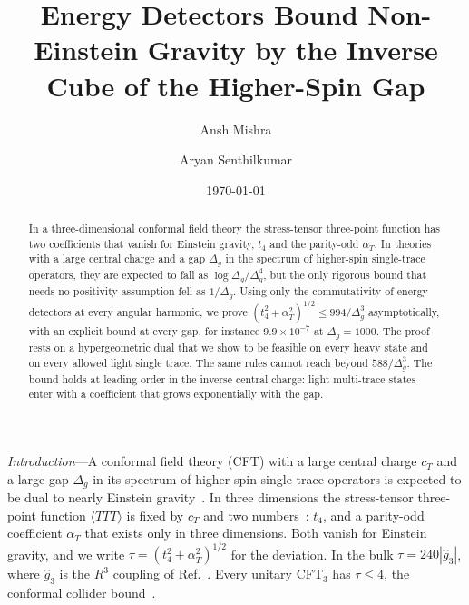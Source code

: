 \documentclass[aps,prl,twocolumn,superscriptaddress,nofootinbib,floatfix]{revtex4-2}
\begin{document}
\title{Energy Detectors Bound Non-Einstein Gravity by the Inverse Cube of the Higher-Spin Gap}

\author{Ansh Mishra}
\author{Aryan Senthilkumar}

\date{\today}

\begin{abstract}
In a three-dimensional conformal field theory the stress-tensor three-point function has two coefficients that vanish for Einstein
gravity, $t_4$ and the parity-odd $\alpha_T$. In theories with a large central charge and a gap $\Delta_g$ in the spectrum of higher-spin
single-trace operators, they are expected to fall as $\log\Delta_g/\Delta_g^4$, but the only rigorous bound that needs no positivity
assumption fell as $1/\Delta_g$. Using only the commutativity of energy detectors at every angular harmonic, we prove
$(t_4^2+\alpha_T^2)^{1/2}\le994/\Delta_g^3$ asymptotically, with an explicit bound at every gap, for instance $9.9\times10^{-7}$ at
$\Delta_g=1000$. The proof rests on a hypergeometric dual that we show to be feasible on every heavy state and on every allowed light
single trace. The same rules cannot reach beyond $588/\Delta_g^3$. The bound holds at leading order in the inverse central charge: light
multi-trace states enter with a coefficient that grows exponentially with the gap.
\end{abstract}

\maketitle

\textit{Introduction}---A conformal field theory (CFT) with a large central charge $c_T$ and a large gap $\Delta_g$ in its spectrum of
higher-spin single-trace operators is expected to be dual to nearly Einstein gravity~\cite{HPPS,CEMZ,AHKT}. In three dimensions the
stress-tensor three-point function $\langle TTT\rangle$ is fixed by $c_T$ and two numbers~\cite{HofmanMaldacena,Buchel,CDPrakash,GPY}:
$t_4$, and a parity-odd coefficient $\alpha_T$ that exists only in three dimensions. Both vanish for Einstein gravity, and we write
$\tau=(t_4^2+\alpha_T^2)^{1/2}$ for the deviation. In the bulk $\tau=240|\hat g_3|$, where $\hat g_3$ is the $R^3$ coupling of
Ref.~\cite{CHLPS}. Every unitary CFT$_3$ has $\tau\le4$, the conformal collider bound~\cite{HofmanMaldacena,CDPrakash}.
\end{document}
